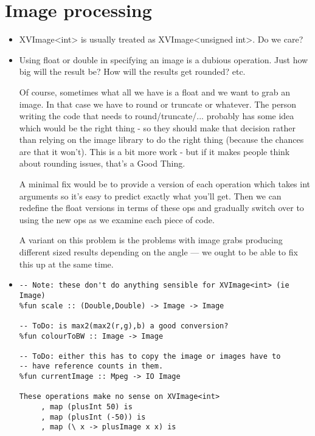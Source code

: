 \section{Image processing}

\begin{itemize}
\item
XVImage<int> is usually treated as XVImage<unsigned int>.
Do we care?

\item
Using float or double in specifying an image is a dubious operation.
Just how big will the result be?  How will the results get rounded?
etc.  

Of course, sometimes what all we have is a float and we want to grab
an image.  In that case we have to round or truncate or whatever.
The person writing the code that needs to round/truncate/... 
probably has some idea which would be the right thing - so they
should make that decision rather than relying on the image library 
to do the right thing (because the chances are that it won't).
This is a bit more work - but if it makes people think about
rounding issues, that's a Good Thing.

A minimal fix would be to provide a version of each operation which
takes int arguments so it's easy to predict exactly what you'll get.
Then we can redefine the float versions in terms of these ops and
gradually switch over to using the new ops as we examine each piece of
code.

A variant on this problem is the problems with image grabs producing
different sized results depending on the angle --- we ought to be able
to fix this up at the same time.


\item
\begin{verbatim}
-- Note: these don't do anything sensible for XVImage<int> (ie Image)
%fun scale :: (Double,Double) -> Image -> Image

-- ToDo: is max2(max2(r,g),b) a good conversion?
%fun colourToBW :: Image -> Image

-- ToDo: either this has to copy the image or images have to 
-- have reference counts in them.
%fun currentImage :: Mpeg -> IO Image

These operations make no sense on XVImage<int>
	 , map (plusInt 50) is
	 , map (plusInt (-50)) is
	 , map (\ x -> plusImage x x) is


\end{verbatim}
\end{itemize}
